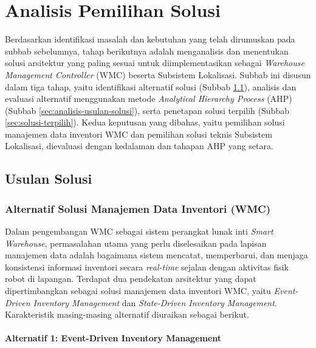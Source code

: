 \section{Analisis Pemilihan Solusi}
Berdasarkan identifikasi masalah dan kebutuhan yang telah dirumuskan pada subbab sebelumnya, tahap berikutnya adalah menganalisis dan menentukan solusi arsitektur yang paling sesuai untuk diimplementasikan sebagai \textit{Warehouse Management Controller} (WMC) beserta Subsistem Lokalisasi. Subbab ini disusun dalam tiga tahap, yaitu identifikasi alternatif solusi (Subbab \ref{sec:usulan-solusi}), analisis dan evaluasi alternatif menggunakan metode \textit{Analytical Hierarchy Process} (AHP) (Subbab \ref{sec:analisis-usulan-solusi}), serta penetapan solusi terpilih (Subbab \ref{sec:solusi-terpilih}). Kedua keputusan yang dibahas, yaitu pemilihan solusi manajemen data inventori WMC dan pemilihan solusi teknis Subsistem Lokalisasi, dievaluasi dengan kedalaman dan tahapan AHP yang setara.

\subsection{Usulan Solusi}
\label{sec:usulan-solusi}

\subsubsection{Alternatif Solusi Manajemen Data Inventori (WMC)}
\label{sec:alternatif-solusi-wmc}
Dalam pengembangan WMC sebagai sistem perangkat lunak inti \textit{Smart Warehouse}, permasalahan utama yang perlu diselesaikan pada lapisan manajemen data adalah bagaimana sistem mencatat, memperbarui, dan menjaga konsistensi informasi inventori secara \textit{real-time} sejalan dengan aktivitas fisik robot di lapangan. Terdapat dua pendekatan arsitektur yang dapat dipertimbangkan sebagai solusi manajemen data inventori WMC, yaitu \textit{Event-Driven Inventory Management} dan \textit{State-Driven Inventory Management}. Karakteristik masing-masing alternatif diuraikan sebagai berikut.

\paragraph{Alternatif 1: Event-Driven Inventory Management}

